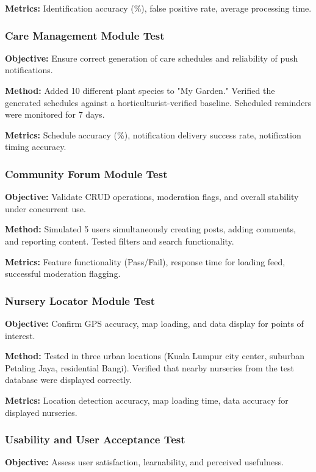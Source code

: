\documentclass[conference]{IEEEtran}
\begin{document}
\textbf{Metrics:} Identification accuracy (\%), false positive rate, average processing time.

\subsubsection{Care Management Module Test}
\textbf{Objective:} Ensure correct generation of care schedules and reliability of push notifications.

\textbf{Method:} Added 10 different plant species to "My Garden." Verified the generated schedules against a horticulturist-verified baseline. Scheduled reminders were monitored for 7 days.

\textbf{Metrics:} Schedule accuracy (\%), notification delivery success rate, notification timing accuracy.

\subsubsection{Community Forum Module Test}
\textbf{Objective:} Validate CRUD operations, moderation flags, and overall stability under concurrent use.

\textbf{Method:} Simulated 5 users simultaneously creating posts, adding comments, and reporting content. Tested filters and search functionality.

\textbf{Metrics:} Feature functionality (Pass/Fail), response time for loading feed, successful moderation flagging.

\subsubsection{Nursery Locator Module Test}
\textbf{Objective:} Confirm GPS accuracy, map loading, and data display for points of interest.

\textbf{Method:} Tested in three urban locations (Kuala Lumpur city center, suburban Petaling Jaya, residential Bangi). Verified that nearby nurseries from the test database were displayed correctly.

\textbf{Metrics:} Location detection accuracy, map loading time, data accuracy for displayed nurseries.

\subsubsection{Usability and User Acceptance Test}
\textbf{Objective:} Assess user satisfaction, learnability, and perceived usefulness.
\end{document}
